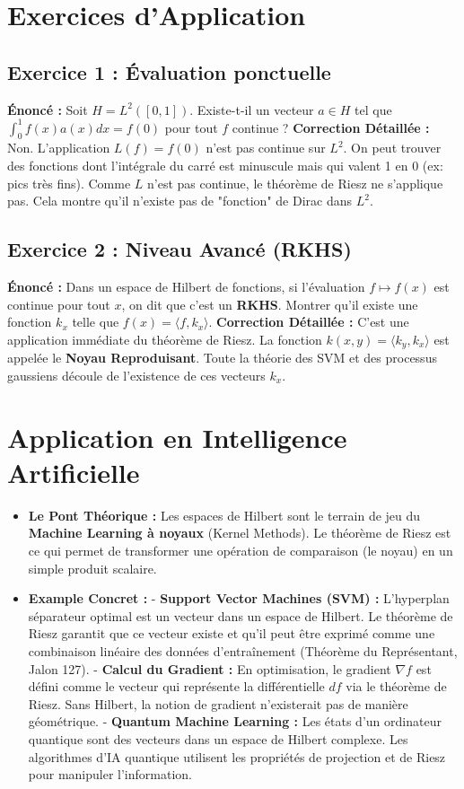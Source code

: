 \documentclass[11pt,a4paper]{article}
\begin{document}
\section{Exercices d'Application}

\subsection{Exercice 1 : Évaluation ponctuelle}
\textbf{Énoncé :} Soit $H = L^2([0, 1])$. Existe-t-il un vecteur $a \in H$ tel que $\int_0^1 f(x) a(x) dx = f(0)$ pour tout $f$ continue ?
\textbf{Correction Détaillée :}
Non. L'application $L(f) = f(0)$ n'est pas continue sur $L^2$. On peut trouver des fonctions dont l'intégrale du carré est minuscule mais qui valent 1 en 0 (ex: pics très fins). Comme $L$ n'est pas continue, le théorème de Riesz ne s'applique pas. Cela montre qu'il n'existe pas de "fonction" de Dirac dans $L^2$.

\subsection{Exercice 2 : Niveau Avancé (RKHS)}
\textbf{Énoncé :} Dans un espace de Hilbert de fonctions, si l'évaluation $f \mapsto f(x)$ est continue pour tout $x$, on dit que c'est un \textbf{RKHS}. Montrer qu'il existe une fonction $k_x$ telle que $f(x) = \langle f, k_x \rangle$.
\textbf{Correction Détaillée :}
C'est une application immédiate du théorème de Riesz. La fonction $k(x, y) = \langle k_y, k_x \rangle$ est appelée le \textbf{Noyau Reproduisant}. Toute la théorie des SVM et des processus gaussiens découle de l'existence de ces vecteurs $k_x$.

\section{Application en Intelligence Artificielle}

\begin{itemize}
\item \textbf{Le Pont Théorique :} Les espaces de Hilbert sont le terrain de jeu du \textbf{Machine Learning à noyaux} (Kernel Methods). Le théorème de Riesz est ce qui permet de transformer une opération de comparaison (le noyau) en un simple produit scalaire.
\item \textbf{Example Concret :}
    - \textbf{Support Vector Machines (SVM) :} L'hyperplan séparateur optimal est un vecteur dans un espace de Hilbert. Le théorème de Riesz garantit que ce vecteur existe et qu'il peut être exprimé comme une combinaison linéaire des données d'entraînement (Théorème du Représentant, Jalon 127).
    - \textbf{Calcul du Gradient :} En optimisation, le gradient $\nabla f$ est défini comme le vecteur qui représente la différentielle $df$ via le théorème de Riesz. Sans Hilbert, la notion de gradient n'existerait pas de manière géométrique.
    - \textbf{Quantum Machine Learning :} Les états d'un ordinateur quantique sont des vecteurs dans un espace de Hilbert complexe. Les algorithmes d'IA quantique utilisent les propriétés de projection et de Riesz pour manipuler l'information.
\end{itemize}
\end{document}
